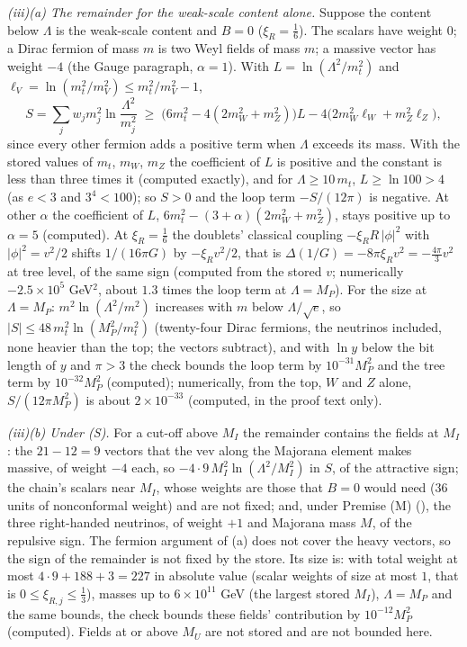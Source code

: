 \emph{(iii)(a) The remainder for the weak-scale content alone.} Suppose the content below $\Lambda$ is the weak-scale content and $B = 0$ ($\xi_{R} = \tfrac16$). The scalars have weight $0$; a Dirac fermion of mass $m$ is two Weyl fields of mass $m$; a massive vector has weight $-4$ (the Gauge paragraph, $\alpha = 1$). With $L = \ln(\Lambda^{2}/m_{t}^{2})$ and $\ell_{V} = \ln(m_{t}^{2}/m_{V}^{2}) \le m_{t}^{2}/m_{V}^{2} - 1$,
\[
S = \sum_{j}w_{j}m_{j}^{2}\ln\frac{\Lambda^{2}}{m_{j}^{2}} \;\ge\; \bigl(6m_{t}^{2} - 4(2m_{W}^{2} + m_{Z}^{2})\bigr)L - 4\bigl(2m_{W}^{2}\ell_{W} + m_{Z}^{2}\ell_{Z}\bigr),
\]
since every other fermion adds a positive term when $\Lambda$ exceeds its mass. With the stored values of $m_{t}$, $m_{W}$, $m_{Z}$ the coefficient of $L$ is positive and the constant is less than three times it (computed exactly), and for $\Lambda \ge 10\,m_{t}$, $L \ge \ln 100 > 4$ (as $e < 3$ and $3^{4} < 100$); so $S > 0$ and the loop term $-S/(12\pi)$ is negative. At other $\alpha$ the coefficient of $L$, $6m_{t}^{2} - (3 + \alpha)(2m_{W}^{2} + m_{Z}^{2})$, stays positive up to $\alpha = 5$ (computed). At $\xi_{R} = \tfrac16$ the doublets' classical coupling $-\xi_{R}R\,|\phi|^{2}$ with $|\phi|^{2} = v^{2}/2$ shifts $1/(16\pi G)$ by $-\xi_{R}v^{2}/2$, that is $\Delta(1/G) = -8\pi\xi_{R}v^{2} = -\tfrac{4\pi}{3}v^{2}$ at tree level, of the same sign (computed from the stored $v$; numerically $-2.5 \times 10^{5}$ GeV$^{2}$, about $1.3$ times the loop term at $\Lambda = M_{P}$). For the size at $\Lambda = M_{P}$: $m^{2}\ln(\Lambda^{2}/m^{2})$ increases with $m$ below $\Lambda/\sqrt{e}$, so $|S| \le 48\,m_{t}^{2}\ln(M_{P}^{2}/m_{t}^{2})$ (twenty-four Dirac fermions, the neutrinos included, none heavier than the top; the vectors subtract), and with $\ln y$ below the bit length of $y$ and $\pi > 3$ the check bounds the loop term by $10^{-31}M_{P}^{2}$ and the tree term by $10^{-32}M_{P}^{2}$ (computed); numerically, from the top, $W$ and $Z$ alone, $S/(12\pi M_{P}^{2})$ is about $2 \times 10^{-33}$ (computed, in the proof text only).

\emph{(iii)(b) Under (S).} For a cut-off above $M_{I}$ the remainder contains the fields at $M_{I}$: the $21 - 12 = 9$ vectors that the vev along the Majorana element makes massive, of weight $-4$ each, so $-4 \cdot 9\,M_{I}^{2}\ln(\Lambda^{2}/M_{I}^{2})$ in $S$, of the attractive sign; the chain's scalars near $M_{I}$, whose weights are those that $B = 0$ would need ($36$ units of nonconformal weight) and are not fixed; and, under Premise (M) (), the three right-handed neutrinos, of weight $+1$ and Majorana mass $M$, of the repulsive sign. The fermion argument of (a) does not cover the heavy vectors, so the sign of the remainder is not fixed by the store. Its size is: with total weight at most $4 \cdot 9 + 188 + 3 = 227$ in absolute value (scalar weights of size at most $1$, that is $0 \le \xi_{R,j} \le \tfrac13$), masses up to $6 \times 10^{11}$ GeV (the largest stored $M_{I}$), $\Lambda = M_{P}$ and the same bounds, the check bounds these fields' contribution by $10^{-12}M_{P}^{2}$ (computed). Fields at or above $M_{U}$ are not stored and are not bounded here.

